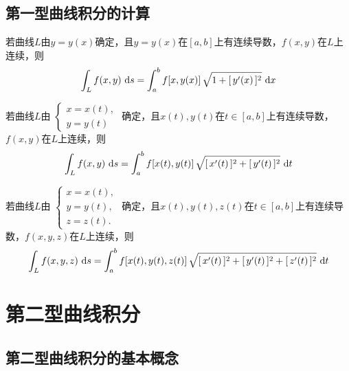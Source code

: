 \subsection{第一型曲线积分的计算}
\vspace*{-1em}

\theorem[直角坐标下平面曲线的积分]
若曲线$L$由$y=y(x)$确定，且$y=y(x)$在$[a,b]$上有连续导数，$f(x,y)$在$L$上连续，则
\begin{equation}
	\int_{L}f(x,y)\,\,{\rm{d}} s =\int_{a}^{b}f[x,y(x)]\,\sqrt{1+[\,y'(x)\,]^2}\,\,{\rm{d}} x
\end{equation}

\theorem[参数方程下平面曲线的积分]
若曲线$L$由
$
\begin{cases}
	x=x(t),\\
	y=y(t)
\end{cases}
$
确定，且$x(t),y(t)$在$t \in [a,b]$上有连续导数，$f(x,y)$在$L$上连续，则
\begin{equation}
	\int_{L}f(x,y)\,\,{\rm{d}} s =\int_{a}^{b}f[x(t),y(t)]\,\sqrt{[\,x'(t)\,]^2+[\,y'(t)\,]^2}\,\,{\rm{d}} t
\end{equation}

\theorem[参数方程下空间曲线的积分]
若曲线$L$由
$
\begin{cases}
	x=x(t),\\
	y=y(t),\\
	z=z(t).
\end{cases}
$
确定，且$x(t),y(t),z(t)$在$t \in [a,b]$上有连续导数，$f(x,y,z)$在$L$上连续，则
\begin{equation}
	\int_{L}f(x,y,z)\,\,{\rm{d}} s =\int_{a}^{b}f[x(t),y(t),z(t)]\,\sqrt{[\,x'(t)\,]^2+[\,y'(t)\,]^2+[\,z'(t)\,]^2}\,\,{\rm{d}} t
\end{equation}


\section{第二型曲线积分}
\subsection{第二型曲线积分的基本概念}
\vspace*{-1em}

